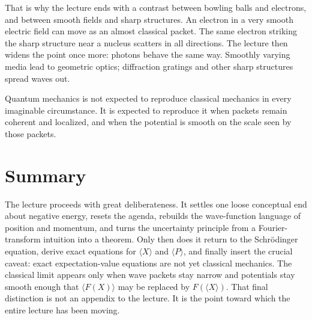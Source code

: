 That is why the lecture ends with a contrast between bowling balls and electrons, and between smooth fields and sharp structures. An electron in a very smooth electric field can move as an almost classical packet. The same electron striking the sharp structure near a nucleus scatters in all directions. The lecture then widens the point once more: photons behave the same way. Smoothly varying media lead to geometric optics; diffraction gratings and other sharp structures spread waves out.

\begin{remark}
Quantum mechanics is not expected to reproduce classical mechanics in every imaginable circumstance. It is expected to reproduce it when packets remain coherent and localized, and when the potential is smooth on the scale seen by those packets.
\end{remark}

\section{Summary}

The lecture proceeds with great deliberateness. It settles one loose conceptual end about negative energy, resets the agenda, rebuilds the wave-function language of position and momentum, and turns the uncertainty principle from a Fourier-transform intuition into a theorem. Only then does it return to the Schr\"odinger equation, derive exact equations for \(\langle X\rangle\) and \(\langle P\rangle\), and finally insert the crucial caveat: exact expectation-value equations are not yet classical mechanics. The classical limit appears only when wave packets stay narrow and potentials stay smooth enough that \(\langle F(X)\rangle\) may be replaced by \(F(\langle X\rangle)\). That final distinction is not an appendix to the lecture. It is the point toward which the entire lecture has been moving.